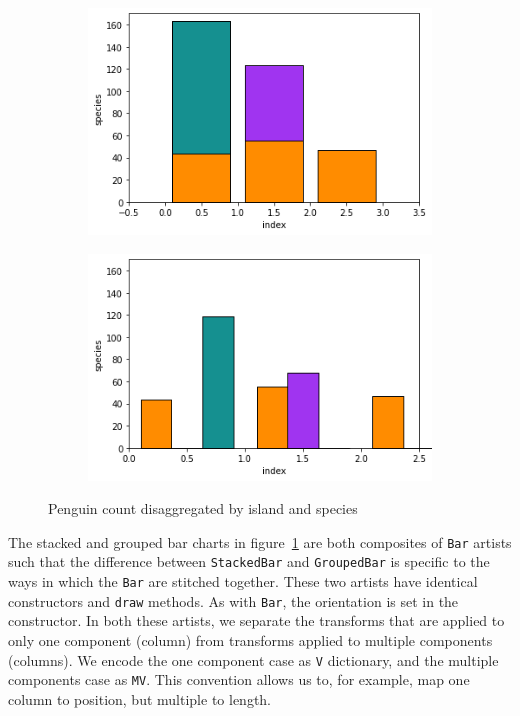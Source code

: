 \documentclass[../main.tex]{subfiles}
\begin{document}
\begin{figure}[H]
    \begin{subfigure}{0.5\textwidth}
        \includegraphics[width=\textwidth]{figures/code/bar_stacked.png}
        \caption{}
    \end{subfigure}
    \begin{subfigure}{0.5\textwidth}
        \includegraphics[width=\textwidth]{figures/code/bar_grouped.png}
        \caption{}
    \end{subfigure}
    \caption{Penguin count disaggregated by island and species}
    \label{fig:code_bar_multi}
\end{figure}
The stacked and grouped bar charts in figure~\ref{fig:code_bar_multi} are both composites of \texttt{Bar} artists such that the difference between \texttt{StackedBar} and \texttt{GroupedBar} is specific to the ways in which the \texttt{Bar} are stitched together. These two artists have identical constructors and \texttt{draw} methods. As with \texttt{Bar}, the orientation is set in the constructor. In both these artists, we separate the transforms that are applied to only one component (column) from transforms applied to multiple components (columns). We encode the one component case as \texttt{V} dictionary, and the multiple components case as \texttt{MV}. This convention allows us to, for example, map one column to position, but multiple to length. 
\end{document}
